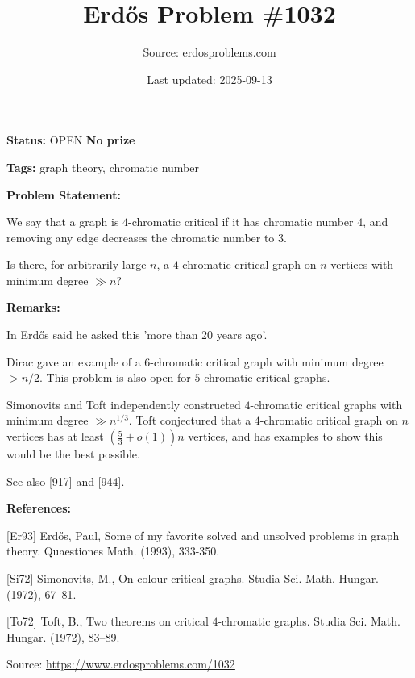\documentclass{article}
\title{Erd\H{o}s Problem \#1032}
\date{Last updated: 2025-09-13}
\author{Source: erdosproblems.com}
\begin{document}
\maketitle

\noindent\textbf{Status:} OPEN \quad \textbf{No prize}

\noindent\textbf{Tags:} graph theory, chromatic number

\medskip
\noindent\textbf{Problem Statement:}

We say that a graph is $4$-chromatic critical if it has chromatic number $4$, and removing any edge decreases the chromatic number to $3$.

Is there, for arbitrarily large $n$, a $4$-chromatic critical graph on $n$ vertices with minimum degree $\gg n$?

\bigskip
\noindent\textbf{Remarks:}

In \cite{Er93} Erd\H{o}s said he asked this 'more than 20 years ago'. 

Dirac gave an example of a $6$-chromatic critical graph with minimum degree $>n/2$. This problem is also open for $5$-chromatic critical graphs.

Simonovits \cite{Si72} and Toft \cite{To72} independently constructed $4$-chromatic critical graphs with minimum degree $\gg n^{1/3}$. Toft conjectured that a $4$-chromatic critical graph on $n$ vertices has at least $(\frac{5}{3}+o(1))n$ vertices, and has examples to show this would be the best possible.

See also [917] and [944].

\bigskip
\noindent\textbf{References:}

[Er93] Erd\H{o}s, Paul, Some of my favorite solved and unsolved problems in graph theory. Quaestiones Math. (1993), 333-350.
 
 [Si72] Simonovits, M., On colour-critical graphs. Studia Sci. Math. Hungar. (1972), 67--81.
 
 [To72] Toft, B., Two theorems on critical {$4$}-chromatic graphs. Studia Sci. Math. Hungar. (1972), 83--89.

\bigskip
\noindent\small{Source: \url{https://www.erdosproblems.com/1032}}
\end{document}
